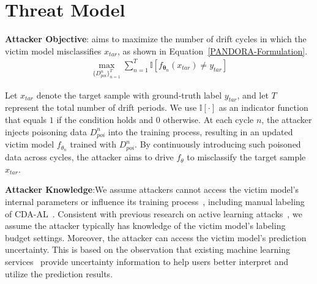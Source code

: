 \section{Threat Model}
\label{Sec: Threat Model}
\textbf{Attacker Objective}: \pandora aims to maximize the number of drift cycles in which the victim model misclassifies $x_{tar}$, as shown in Equation~\ref{PANDORA-Formulation}.
\begin{equation}
	\begin{aligned}
			\max_{ \{ D_{poi}^{n} \}_{n=1}^{T} } \sum_{n=1}^{T} \mathbb{I}[ f_{\bm{\theta}_{n}}(x_{tar}) \neq y_{tar} ]
	\end{aligned}
	\label{PANDORA-Formulation}
\end{equation}

Let $x_{tar}$ denote the target sample with ground-truth label $y_{tar}$, and let $T$ represent the total number of drift periods.
We use $\mathbb{I}[\cdot]$ as an indicator function that equals $1$ if the condition holds and $0$ otherwise.
At each cycle $n$, the attacker injects poisoning data $D_{poi}^{n}$ into the training process, resulting in an updated victim model $f_{\theta_{n}}$ trained with $D_{poi}^{n}$.
By continuously introducing such poisoned data across cycles, the attacker aims to drive $f_{\theta}$ to misclassify the target sample $x_{tar}$.

\textbf{Attacker Knowledge}:We assume attackers cannot access the victim model's internal parameters or influence its training process~\cite{2017-ASIACCS-Black-Box-Attack}, including manual labeling of CDA-AL~\cite{2023-Usenix-chenyizhen}.
Consistent with previous research on active learning attacks~\cite{2021-Usenix-active-learning-backdoor}, we assume the attacker typically has knowledge of the victim model's labeling budget settings.
Moreover, the attacker can access the victim model’s prediction uncertainty.
This is based on the observation that existing machine learning services~\cite{2025-Baidu-Image-Recognition} provide uncertainty information to help users better interpret and utilize the prediction results.


